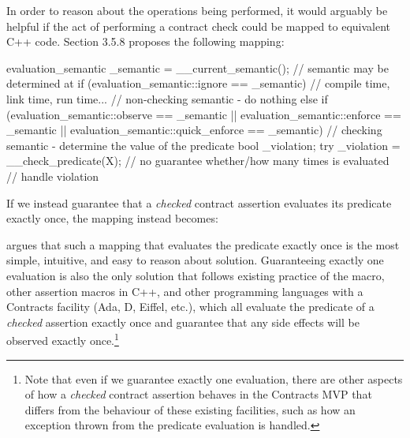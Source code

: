 In order to reason about the operations being performed, it would arguably be helpful if the act of performing a contract check could be mapped to equivalent C++ code. \cite{P2900R6} Section 3.5.8 proposes the following mapping:
\begin{codeblock}
evaluation_semantic _semantic = __current_semantic(); // semantic may be determined at 
if (evaluation_semantic::ignore == _semantic) {       // compile time, link time, run time...
  // non-checking semantic - do nothing
}
else if (evaluation_semantic::observe       == _semantic
      || evaluation_semantic::enforce       == _semantic
      || evaluation_semantic::quick_enforce == _semantic) {
  // checking semantic - determine the value of the predicate
  bool _violation;
  try {
    _violation = __check_predicate(X);   // no guarantee whether/how many times  is evaluated
  }
  // handle violation
}
\end{codeblock}
If we instead guarantee that a \emph{checked} contract assertion evaluates its predicate exactly once, the mapping instead becomes:
\begin{codeblock}
  // ...
  // checking semantic - determine the value of the predicate
  bool _violation;
  try {
    _violation = !X;   // evaluates  exactly once
  }
  // handle violation
}
\end{codeblock}

\cite{P2756R0} argues that such a mapping that evaluates the predicate exactly once is the most simple, intuitive, and easy to reason about solution. Guaranteeing exactly one evaluation is also the only solution that follows existing practice of the  macro, other assertion macros in C++, and other programming languages with a Contracts facility (Ada, D, Eiffel, etc.), which all evaluate the predicate of a \emph{checked} assertion exactly once and guarantee that any side effects will be observed exactly once.\footnote{Note that even if we guarantee exactly one evaluation, there are other aspects of how a \emph{checked} contract assertion behaves in the Contracts MVP that differs from the behaviour of these existing facilities, such as how an exception thrown from the predicate evaluation is handled.}

